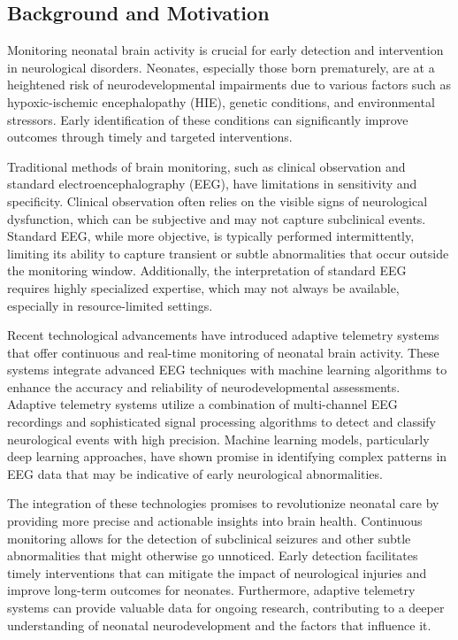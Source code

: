 \documentclass[12pt,journal,compsoc]{IEEEtran}
\begin{document}
\subsection{Background and Motivation}
Monitoring neonatal brain activity is crucial for early detection and intervention in neurological disorders. Neonates, especially those born prematurely, are at a heightened risk of neurodevelopmental impairments due to various factors such as hypoxic-ischemic encephalopathy (HIE), genetic conditions, and environmental stressors. Early identification of these conditions can significantly improve outcomes through timely and targeted interventions.

Traditional methods of brain monitoring, such as clinical observation and standard electroencephalography (EEG), have limitations in sensitivity and specificity. Clinical observation often relies on the visible signs of neurological dysfunction, which can be subjective and may not capture subclinical events. Standard EEG, while more objective, is typically performed intermittently, limiting its ability to capture transient or subtle abnormalities that occur outside the monitoring window. Additionally, the interpretation of standard EEG requires highly specialized expertise, which may not always be available, especially in resource-limited settings.

Recent technological advancements have introduced adaptive telemetry systems that offer continuous and real-time monitoring of neonatal brain activity. These systems integrate advanced EEG techniques with machine learning algorithms to enhance the accuracy and reliability of neurodevelopmental assessments. Adaptive telemetry systems utilize a combination of multi-channel EEG recordings and sophisticated signal processing algorithms to detect and classify neurological events with high precision. Machine learning models, particularly deep learning approaches, have shown promise in identifying complex patterns in EEG data that may be indicative of early neurological abnormalities.

The integration of these technologies promises to revolutionize neonatal care by providing more precise and actionable insights into brain health. Continuous monitoring allows for the detection of subclinical seizures and other subtle abnormalities that might otherwise go unnoticed. Early detection facilitates timely interventions that can mitigate the impact of neurological injuries and improve long-term outcomes for neonates. Furthermore, adaptive telemetry systems can provide valuable data for ongoing research, contributing to a deeper understanding of neonatal neurodevelopment and the factors that influence it.
\end{document}

